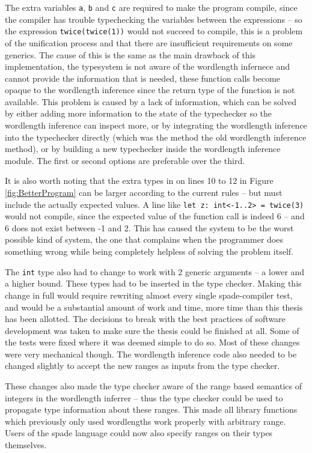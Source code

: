 The extra variables \verb+a+, \verb+b+ and \verb+c+ are required to make the program compile, since the compiler has trouble typechecking the variables between the expressions -- so the expression \verb+twice(twice(1))+ would not succeed to compile, this is a problem of the unification process and that there are insufficient requirements on some generics. The cause of this is the same as the main drawback of this implementation, the typesystem is not aware of the wordlength infernece and cannot provide the information that is needed, these function calls become opaque to the wordlength inference since the return type of the function is not available. This problem is caused by a lack of information, which can be solved by either adding more information to the state of the typechecker so the wordlength inference can inspect more, or by integrating the wordlength inference into the typechecker directly (which was the method the old wordlength inference method), or by building a new typechecker inside the wordlength inference module. The first or second options are preferable over the third.

It is also worth noting that the extra types in on lines 10 to 12 in Figure \ref{fig:BetterProgram} can be larger according to the current rules -- but must include the actually expected values. A line like \verb+let z: int<-1..2> = twice(3)+ would not compile, since the expected value of the function call is indeed 6 -- and 6 does not exist between -1 and 2. This has caused the system to be the worst possible kind of system, the one that complains when the programmer does something wrong while being completely helpless of solving the problem itself.

The \verb+int+ type also had to change to work with 2 generic arguments -- a lower and a higher bound. These types had to be inserted in the type checker. Making this change in full would require rewriting almost every single spade-compiler test, and would be a substantial amount of work and time, more time than this thesis has been allotted. The decisions to break with the best practices of software development was taken to make sure the thesis could be finished at all. Some of the tests were fixed where it was deemed simple to do so. Most of these changes were very mechanical though. The wordlength inference code also needed to be changed slightly to accept the new ranges as inputs from the type checker.

These changes also made the type checker aware of the range based semantics of integers in the wordlength inferrer -- thus the type checker could be used to propagate type information about these ranges. This made all library functions which previously only used wordlengths work properly with arbitrary range. Users of the spade language could now also specify ranges on their types themselves.

